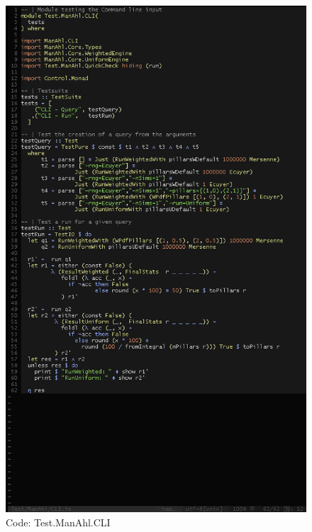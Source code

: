 \documentclass[12pt,a4paper,article]{memoir} %
\begin{document}
\begin{figure}[h!]
\centering
\includegraphics[width=1\textwidth]{img/code-test-cli.png}
\caption{Code: Test.ManAhl.CLI}
\label{fig:test.cli}
\end{figure}
\end{document}
